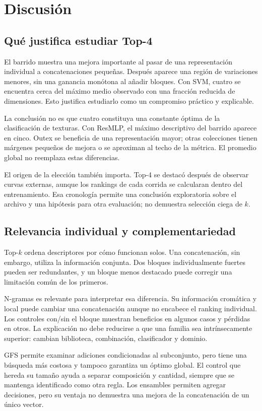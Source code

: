 \chapter{Discusión}\label{sec:discusion}

\section{Qué justifica estudiar Top-4}
El barrido muestra una mejora importante al pasar de una representación individual a concatenaciones pequeñas. Después aparece una región de variaciones menores, sin una ganancia monótona al añadir bloques. Con SVM, cuatro se encuentra cerca del máximo medio observado con una fracción reducida de dimensiones. Esto justifica estudiarlo como un compromiso práctico y explicable.

La conclusión no es que cuatro constituya una constante óptima de la clasificación de texturas. Con ResMLP, el máximo descriptivo del barrido aparece en cinco. Outex se beneficia de una representación mayor; otras colecciones tienen márgenes pequeños de mejora o se aproximan al techo de la métrica. El promedio global no reemplaza estas diferencias.

El origen de la elección también importa. Top-4 se destacó después de observar curvas externas, aunque los rankings de cada corrida se calcularan dentro del entrenamiento. Esa cronología permite una conclusión exploratoria sobre el archivo y una hipótesis para otra evaluación; no demuestra selección ciega de \(k\).

\section{Relevancia individual y complementariedad}
Top-\(k\) ordena descriptores por cómo funcionan solos. Una concatenación, sin embargo, utiliza la información conjunta. Dos bloques individualmente fuertes pueden ser redundantes, y un bloque menos destacado puede corregir una limitación común de los primeros.

N-gramas es relevante para interpretar esa diferencia. Su información cromática y local puede cambiar una concatenación aunque no encabece el ranking individual. Los controles con/sin el bloque muestran beneficios en algunos casos y pérdidas en otros. La explicación no debe reducirse a que una familia sea intrínsecamente superior: cambian biblioteca, combinación, clasificador y dominio.

GFS permite examinar adiciones condicionadas al subconjunto, pero tiene una búsqueda más costosa y tampoco garantiza un óptimo global. El control que hereda su tamaño ayuda a separar composición y cantidad, siempre que se mantenga identificado como otra regla. Los ensambles permiten agregar decisiones, pero su ventaja no demuestra una mejora de la concatenación de un único vector.

